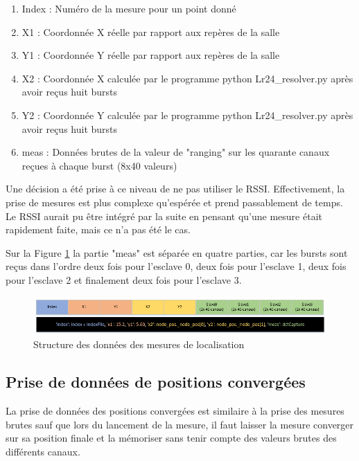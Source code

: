 \begin{enumerate}
 \item Index : Numéro de la mesure pour un point donné
 \item X1 : Coordonnée X réelle par rapport aux repères de la salle 
 \item Y1 : Coordonnée Y réelle par rapport aux repères de la salle 
 \item X2 : Coordonnée X calculée par le programme python Lr24\_resolver.py après avoir reçus huit bursts
 \item Y2 : Coordonnée Y calculée par le programme python Lr24\_resolver.py après avoir reçus huit bursts
 \item meas : Données brutes de la valeur de "ranging" sur les quarante canaux reçues à chaque burst (8x40 valeurs)
\end{enumerate}

Une décision a été prise à ce niveau de ne pas utiliser le RSSI. Effectivement, la prise de mesures est plus complexe qu'espérée et prend passablement de temps. Le RSSI aurait pu être intégré par la suite en pensant qu'une mesure était rapidement faite, mais ce n'a pas été le cas. 

Sur la Figure \ref{fig:dataStruct} la partie "meas" est séparée en quatre parties, car les bursts sont reçus dans l'ordre deux fois pour l'esclave 0, deux fois pour l'esclave 1, deux fois pour l'esclave 2 et finalement deux fois pour l'esclave 3. 

\begin{figure}[htp]
 \begin{center}
  \includegraphics[scale=0.7]{figures/dataStruct.png}
  \caption{Structure des données des mesures de localisation}
  \label{fig:dataStruct} %
 \end{center}
\end{figure}

\subsection{Prise de données de positions convergées}
La prise de données des positions convergées est similaire à la prise des mesures brutes sauf que lors du lancement de la mesure, il faut laisser la mesure converger sur sa position finale et la mémoriser sans tenir compte des valeurs brutes des différents canaux.


